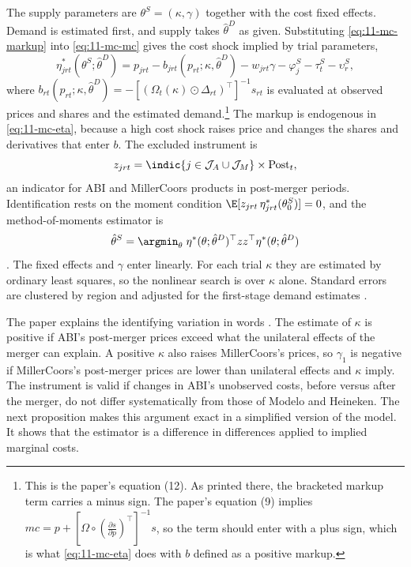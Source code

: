 The supply parameters are $\theta^S = (\kappa, \gamma)$ together with the cost fixed effects. Demand is estimated
first, and supply takes $\hat\theta^D$ as given. Substituting \eqref{eq:11-mc-markup} into \eqref{eq:11-mc-mc} gives
the cost shock implied by trial parameters,
\begin{equation}\label{eq:11-mc-eta}
  \eta^*_{jrt}(\theta^S;\hat\theta^D) = p_{jrt} - b_{jrt}(p_{rt};\kappa,\hat\theta^D) - w_{jrt}\gamma - \varphi^S_j -
  \tau^S_t - \upsilon^S_r ,
\end{equation}
where $b_{rt}(p_{rt};\kappa,\hat\theta^D) = -[(\Omega_t(\kappa)\odot\Delta_{rt})^\top]^{-1}s_{rt}$ is evaluated at
observed prices and shares and the estimated demand.\footnote{This is the paper's equation (12). As printed there, the
bracketed markup term carries a minus sign. The paper's equation (9) implies $mc = p + [\Omega\circ(\frac{\partial
s}{\partial p})^\top]^{-1}s$, so the term should enter with a plus sign, which is what \eqref{eq:11-mc-eta} does with
$b$ defined as a positive markup.} The markup is endogenous in \eqref{eq:11-mc-eta}, because a high cost shock
raises price and changes the shares and derivatives that enter $b$. The excluded instrument is
\begin{equation}\label{eq:11-mc-zsupply}
  z_{jrt} = \indic\{j \in \mathcal{J}_A \cup \mathcal{J}_M\} \times \text{Post}_t ,
\end{equation}
an indicator for ABI and MillerCoors products in post-merger periods. Identification rests on the moment condition
$\E[z_{jrt}\,\eta^*_{jrt}(\theta^S_0)] = 0$, and the method-of-moments estimator is
\begin{equation}\label{eq:11-mc-supplygmm}
  \hat\theta^S = \argmin_{\theta}\; \eta^*(\theta;\hat\theta^D)^\top z z^\top \eta^*(\theta;\hat\theta^D)
\end{equation}
\citep[eq.~(13)]{MillerWeinberg2017}. The fixed effects and $\gamma$ enter linearly. For each trial $\kappa$ they
are estimated by ordinary least squares, so the nonlinear search is over $\kappa$ alone. Standard errors are clustered
by region and adjusted for the first-stage demand estimates \citep{Wooldridge2010}.

The paper explains the identifying variation in words \citep[p.~1780]{MillerWeinberg2017}. The estimate of $\kappa$
is positive if ABI's post-merger prices exceed what the unilateral effects of the merger can explain. A positive
$\kappa$ also raises MillerCoors's prices, so $\gamma_1$ is negative if MillerCoors's post-merger prices are lower
than unilateral effects and $\kappa$ imply. The instrument is valid if changes in ABI's unobserved costs, before
versus after the merger, do not differ systematically from those of Modelo and Heineken. The next proposition makes
this argument exact in a simplified version of the model. It shows that the estimator is a difference in differences
applied to implied marginal costs.

